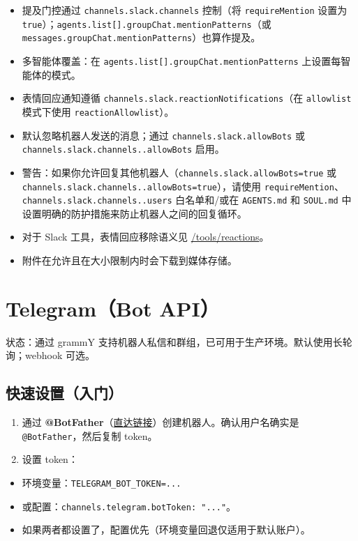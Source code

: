 \begin{itemize}
  \item 提及门控通过 \texttt{channels.slack.channels} 控制（将 \texttt{requireMention} 设置为 \texttt{true}）；\texttt{agents.list[].groupChat.mentionPatterns}（或 \texttt{messages.groupChat.mentionPatterns}）也算作提及。
  \item 多智能体覆盖：在 \texttt{agents.list[].groupChat.mentionPatterns} 上设置每智能体的模式。
  \item 表情回应通知遵循 \texttt{channels.slack.reactionNotifications}（在 \texttt{allowlist} 模式下使用 \texttt{reactionAllowlist}）。
  \item 默认忽略机器人发送的消息；通过 \texttt{channels.slack.allowBots} 或 \texttt{channels.slack.channels..allowBots} 启用。
  \item 警告：如果你允许回复其他机器人（\texttt{channels.slack.allowBots=true} 或 \texttt{channels.slack.channels..allowBots=true}），请使用 \texttt{requireMention}、\texttt{channels.slack.channels..users} 白名单和/或在 \texttt{AGENTS.md} 和 \texttt{SOUL.md} 中设置明确的防护措施来防止机器人之间的回复循环。
  \item 对于 Slack 工具，表情回应移除语义见 \href{/tools/reactions}{/tools/reactions}。
  \item 附件在允许且在大小限制内时会下载到媒体存储。
\end{itemize}



\clearpage

\section{Telegram（Bot API）}


状态：通过 grammY 支持机器人私信和群组，已可用于生产环境。默认使用长轮询；webhook 可选。

\subsection{快速设置（入门）}


\begin{enumerate}
  \item 通过 \textbf{@BotFather}（\href{https://t.me/BotFather}{直达链接}）创建机器人。确认用户名确实是 \texttt{@BotFather}，然后复制 token。
  \item 设置 token：
\end{enumerate}

\begin{itemize}
  \item 环境变量：\texttt{TELEGRAM\_BOT\_TOKEN=...}
  \item 或配置：\texttt{channels.telegram.botToken: "..."}。
  \item 如果两者都设置了，配置优先（环境变量回退仅适用于默认账户）。
\end{itemize}

